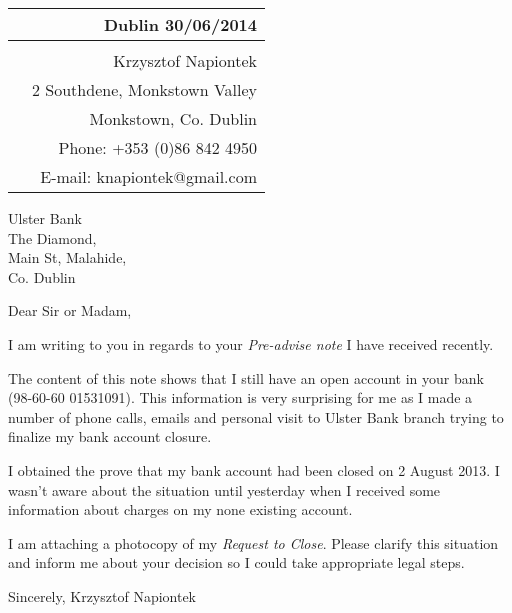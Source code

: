 \documentclass[11pt,a4paper]{letter}
\begin{document}
\begin{tabular}{p{6.5cm}r}
& Dublin 30/06/2014\\\hline
\\
& Krzysztof Napiontek\\
& 2 Southdene, Monkstown Valley\\
& Monkstown, Co. Dublin\\
& Phone: +353 (0)86 842 4950\\
& E-mail: knapiontek@gmail.com
\end{tabular}

Ulster Bank\\
The Diamond,\\
Main St, Malahide,\\
Co. Dublin

\bigskip

Dear Sir or Madam,

\parindent 0.4in

I am writing to you in regards to your \textit{Pre-advise note} I have received recently.

The content of this note shows that I still have an open account in your bank (98-60-60 01531091). This information is very surprising for me as I made a number of phone calls, emails and personal visit to Ulster Bank branch trying to finalize my bank account closure.

I obtained the prove that my bank account had been closed on 2 August 2013. I wasn't aware about the situation until yesterday when I received some information about charges on my none existing account.

I am attaching a photocopy of my \textit{Request to Close}. Please clarify this situation and inform me about your decision so I could take appropriate legal steps.

\hspace*{\longindentation}
\parbox{\indentedwidth}
{
	\raggedright Sincerely,
	\vskip 0.65in
	Krzysztof Napiontek
}
\end{document}
